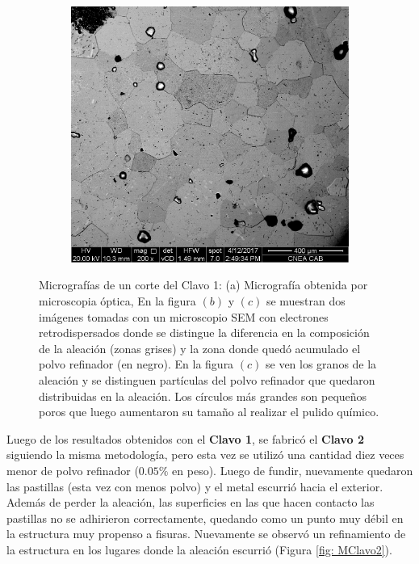 \documentclass[a4paper,12pt,fleqn,twoside,openany]{book}
\begin{document}
\begin{figure}
\begin{subfigure}{0.3\textwidth}
        \caption{}%
        \label{fig: SEM1Clavo1}
    \end{subfigure}
        \begin{subfigure}{0.3\textwidth}
        \includegraphics[width=\textwidth]{Img/Resultados/clavos/Clavo1Retro2.jpg}
        \caption{}%
        \label{fig: Sem2Clavo1}
    \end{subfigure}
    \caption{Micrografías de un corte del Clavo 1: (a) Micrografía obtenida por microscopia óptica, En la figura $(b)$ y $(c)$ se muestran dos imágenes tomadas con un microscopio SEM con electrones retrodispersados donde se distingue la diferencia en la composición de la aleación (zonas grises) y la zona donde quedó acumulado el polvo refinador (en negro). En la figura $(c)$ se ven los granos de la aleación y se distinguen partículas del polvo refinador que quedaron distribuidas en la aleación. Los círculos más grandes son pequeños poros que luego aumentaron su tamaño al realizar el pulido químico.}
    \end{figure}

Luego de los resultados obtenidos con el \textbf{Clavo 1}, se fabricó el \textbf{Clavo 2} siguiendo la misma metodología, pero esta vez se utilizó una cantidad diez veces menor de polvo refinador ($0.05\%$ en peso). Luego de fundir, nuevamente quedaron las pastillas (esta vez con menos polvo) y el metal escurrió hacia el exterior. Además de perder la aleación, las superficies en las que hacen contacto las pastillas no se adhirieron correctamente, quedando como un punto muy débil en la estructura muy propenso a fisuras. Nuevamente se observó un refinamiento de la estructura en los lugares donde la aleación escurrió (Figura \ref{fig: MClavo2}).
\end{document}
